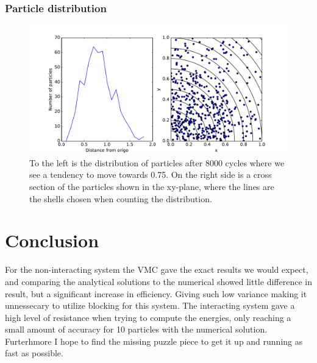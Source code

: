 \documentclass[12pt]{article}
\begin{document}
  \newpage
  \subsubsection{Particle distribution}
  \begin{figure}[h!]
    \centering
    \includegraphics[scale=0.6]{graphs/dist.pdf}
    \caption{To the left is the distribution of particles after 8000 cycles %
      where we see a tendency to move towards 0.75. On the right side is a cross section %
      of the particles shown in the xy-plane, where the lines are the shells %
      chosen when counting the distribution.}
  \end{figure}

  \section{Conclusion}
  For the non-interacting system the VMC gave the exact results we would expect, and comparing
  the analytical solutions to the numerical showed little difference in result, but a significant
  increase in efficiency. Giving such low variance making it unnessecary to utilize blocking for 
  this system.
  The interacting system gave a high level of resistance when trying to compute the energies, only
  reaching a small amount of accuracy for 10 particles with the numerical solution.
  Furterhmore I hope to find the missing puzzle piece to get it up and running as fast as possible.
  
  \newpage
  \appendix
  
  
  
\end{document}
